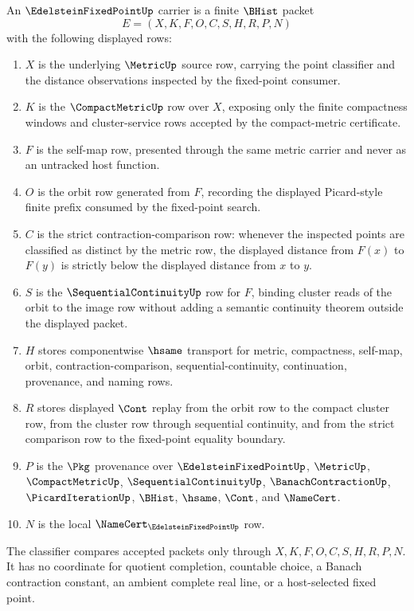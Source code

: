 \begin{definition}\label{def:edelstein-fixed-point-carrier}
An $\EdelsteinFixedPointUp$ carrier is a finite $\BHist$ packet
$$
E=(X,K,F,O,C,S,H,R,P,N)
$$
with the following displayed rows:
\begin{enumerate}
\item $X$ is the underlying $\MetricUp$ source row, carrying the point classifier and the distance observations inspected by the fixed-point consumer.
\item $K$ is the $\CompactMetricUp$ row over $X$, exposing only the finite compactness windows and cluster-service rows accepted by the compact-metric certificate.
\item $F$ is the self-map row, presented through the same metric carrier and never as an untracked host function.
\item $O$ is the orbit row generated from $F$, recording the displayed Picard-style finite prefix consumed by the fixed-point search.
\item $C$ is the strict contraction-comparison row: whenever the inspected points are classified as distinct by the metric row, the displayed distance from $F(x)$ to $F(y)$ is strictly below the displayed distance from $x$ to $y$.
\item $S$ is the $\SequentialContinuityUp$ row for $F$, binding cluster reads of the orbit to the image row without adding a semantic continuity theorem outside the displayed packet.
\item $H$ stores componentwise $\hsame$ transport for metric, compactness, self-map, orbit, contraction-comparison, sequential-continuity, continuation, provenance, and naming rows.
\item $R$ stores displayed $\Cont$ replay from the orbit row to the compact cluster row, from the cluster row through sequential continuity, and from the strict comparison row to the fixed-point equality boundary.
\item $P$ is the $\Pkg$ provenance over $\EdelsteinFixedPointUp$, $\MetricUp$, $\CompactMetricUp$, $\SequentialContinuityUp$, $\BanachContractionUp$, $\PicardIterationUp$, $\BHist$, $\hsame$, $\Cont$, and $\NameCert$.
\item $N$ is the local $\NameCert_{\EdelsteinFixedPointUp}$ row.
\end{enumerate}
The classifier compares accepted packets only through $X,K,F,O,C,S,H,R,P,N$. It has no coordinate for quotient completion, countable choice, a Banach contraction constant, an ambient complete real line, or a host-selected fixed point.
\end{definition}


